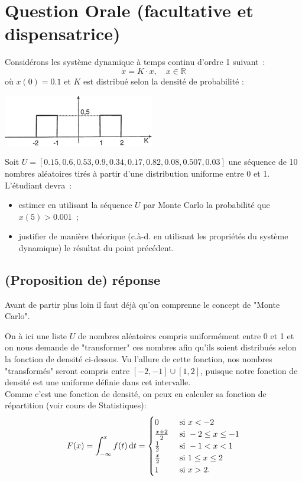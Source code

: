 \documentclass[11pt,a4paper]{report}
\begin{document}
	\section*{Question Orale (facultative et dispensatrice)}
		Considérons les système dynamique à temps continu d'ordre 1 suivant~:
		\[
			\dot{x} = K \cdot x, \quad x \in \mathbb R
		\]
		où $x(0) = 0.1$ et $K$ est distribué selon la densité de probabilité :
		\begin{center}
			\includegraphics[scale=1]{graphique-Q-orale}
		\end{center}
		Soit $U = [0.15, 0.6, 0.53, 0.9, 0.34, 0.17, 0.82, 0.08, 0.507, 0.03]$ une séquence de 10 nombres aléatoires tirés à partir d'une distribution uniforme entre 0 et 1.\\
		L'étudiant devra~:
		\begin{itemize}
			\item estimer en utilisant la séquence $U$ par Monte Carlo la probabilité que $x(5) > 0.001$~;
			\item justifier de manière théorique (c.à-d. en utilisant les propriétés du système dynamique) le résultat du point précédent.
		\end{itemize}
		\pagebreak

		\subsection*{(Proposition de) réponse}
			Avant de partir plus loin il faut déjà qu'on comprenne le concept de "Monte Carlo".

			On à ici une liste $U$ de nombres aléatoires compris uniformément entre 0 et 1 et on nous demande de "transformer" ces nombres afin qu'ils soient distribués selon la fonction de densité ci-dessus.
			Vu l'allure de cette fonction, nos nombres "transformés" seront compris entre $[-2,-1] \cup [1, 2]$, puisque notre fonction de densité est une uniforme définie dans cet intervalle.\\

			Comme c'est une fonction de densité, on peux en calculer sa fonction de répartition (voir cours de Statistiques):
			\[
				F(x) = \int_{-\infty}^x f(t)\dif t =
				\begin{cases}
					0 &\text{ si } x < -2\\
					\frac{x+2}{2} &\text{ si } -2 \leq x \leq -1 \\
					\frac{1}{2} &\text{ si } -1 < x < 1 \\
					\frac{x}{2} &\text{ si } 1 \leq x \leq 2\\
					1 &\text{ si } x > 2.
				\end{cases}
			\]
\end{document}
